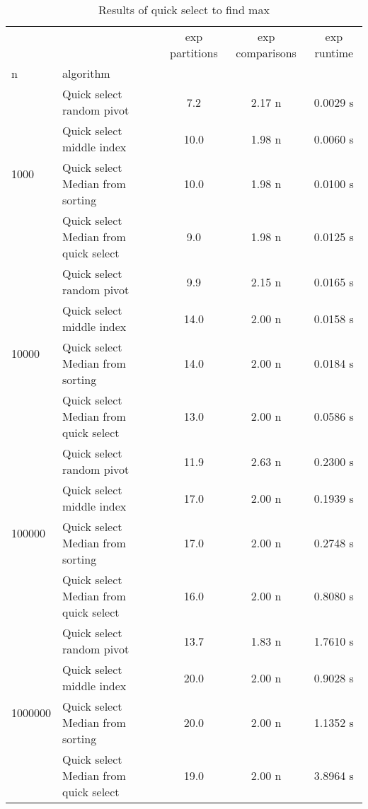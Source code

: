 \documentclass{homeworg}
\begin{document}
\begin{table}[htbp]
\label{q2:result}
\caption{Results of quick select to find max}

    \begin{tabular}{llccc}
    \toprule
            &                                       &  exp partitions & exp comparisons & exp runtime \\
    n & algorithm &                      &                      &                  \\
    \midrule
    \multirow{4}{*}{1000} & Quick select random pivot &                  7.2 &               2.17 n &   0.0029 s \\
            & Quick select middle index &                 10.0 &               \cellcolor{green} 1.98 n &   0.0060 s \\
            & Quick select Median from sorting &                 10.0 &               \cellcolor{green} 1.98 n &   0.0100 s \\
            & Quick select Median from quick select &                  9.0 &               \cellcolor{green} 1.98 n &   0.0125 s \\
    \cline{1-5}
    \multirow{4}{*}{10000} & Quick select random pivot &                  9.9 &               2.15 n &   0.0165 s \\
            & Quick select middle index &                 14.0 &               \cellcolor{green} 2.00 n &   0.0158 s \\
            & Quick select Median from sorting &                 14.0 &               \cellcolor{green} 2.00 n &   0.0184 s \\
            & Quick select Median from quick select &                 13.0 &               \cellcolor{green} 2.00 n &   0.0586 s \\
    \cline{1-5}
    \multirow{4}{*}{100000} & Quick select random pivot &                 11.9 &               2.63 n &   0.2300 s \\
            & Quick select middle index &                 17.0 &               \cellcolor{green} 2.00 n &   0.1939 s \\
            & Quick select Median from sorting &                 17.0 &               \cellcolor{green} 2.00 n &   0.2748 s \\
            & Quick select Median from quick select &                 16.0 &               \cellcolor{green} 2.00 n &   0.8080 s \\
    \cline{1-5}
    \multirow{4}{*}{1000000} & Quick select random pivot &                 13.7 &               1.83 n &   1.7610 s \\
            & Quick select middle index &                 20.0 &               \cellcolor{green} 2.00 n &   0.9028 s \\
            & Quick select Median from sorting &                 20.0 &               \cellcolor{green} 2.00 n &   1.1352 s \\
            & Quick select Median from quick select &                 19.0 &               \cellcolor{green} 2.00 n &   3.8964 s \\
    \bottomrule
    \end{tabular}


\end{table}
\end{document}
